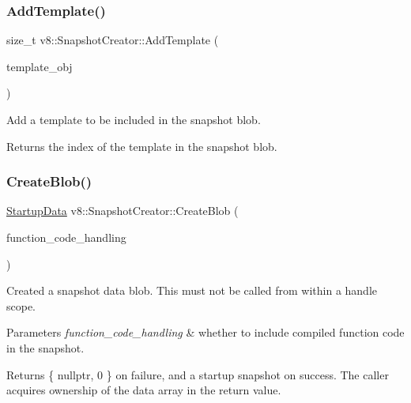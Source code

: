 \subsubsection{\texorpdfstring{Add\+Template()}{AddTemplate()}}
{\footnotesize\ttfamily size\+\_\+t v8\+::\+Snapshot\+Creator\+::\+Add\+Template (\begin{DoxyParamCaption}\item[{\mbox{\hyperlink{classv8_1_1Local}{Local}}$<$ \mbox{\hyperlink{classv8_1_1Template}{Template}} $>$}]{template\+\_\+obj }\end{DoxyParamCaption})}

Add a template to be included in the snapshot blob. \begin{DoxyReturn}{Returns}
the index of the template in the snapshot blob. 
\end{DoxyReturn}
\mbox{\label{classv8_1_1SnapshotCreator_a86b2023acdb88a9bd6eae2695f2b0a8a}} 
\subsubsection{\texorpdfstring{Create\+Blob()}{CreateBlob()}}
{\footnotesize\ttfamily \mbox{\hyperlink{classv8_1_1StartupData}{Startup\+Data}} v8\+::\+Snapshot\+Creator\+::\+Create\+Blob (\begin{DoxyParamCaption}\item[{Function\+Code\+Handling}]{function\+\_\+code\+\_\+handling }\end{DoxyParamCaption})}

Created a snapshot data blob. This must not be called from within a handle scope. 
\begin{DoxyParams}{Parameters}
{\em function\+\_\+code\+\_\+handling} & whether to include compiled function code in the snapshot. \\
\hline
\end{DoxyParams}
\begin{DoxyReturn}{Returns}
\{ nullptr, 0 \} on failure, and a startup snapshot on success. The caller acquires ownership of the data array in the return value. 
\end{DoxyReturn}
\mbox{\label{classv8_1_1SnapshotCreator_a6f9acab93ba6bc6232cd1bfead27dec1}} 
